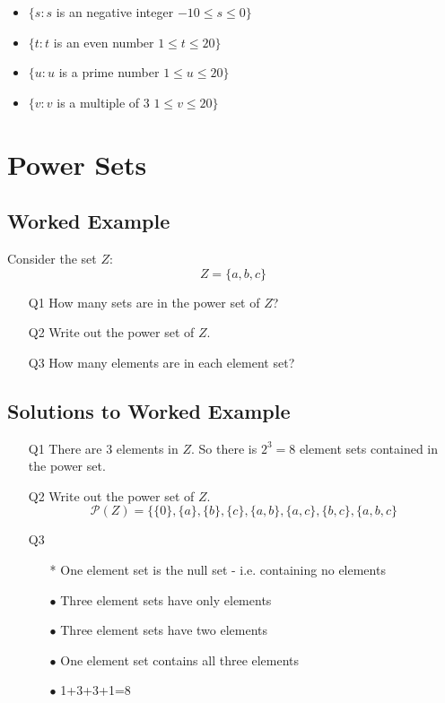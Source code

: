 \documentclass[MASTER.tex]{subfiles}
\begin{document}
\begin{itemize} 
\item $\{ s : s $ is an negative integer $ -10 \leq s \leq 0 \}$
\item $\{ t : t $ is an even number $ 1 \leq t \leq 20 \}$
\item $\{ u : u $ is a prime number $ 1 \leq u \leq 20 \}$
\item $\{ v : v $ is a multiple of 3 $ 1 \leq v \leq 20 \}$
\end{itemize}

\section*{Power Sets}
\subsection*{Worked Example}
Consider the set $Z$:
\[ Z = \{ a,b,c\}  \]
\begin{itemize}
\item[Q1] How many sets are in the power set of $Z$? 
\item[Q2] Write out the power set of $Z$. 
\item[Q3] How many elements are in each element set?
\end{itemize}
\subsection*{Solutions to Worked Example}

\begin{itemize}


\item[Q1] There are 3 elements in $Z$. So there is $2^3 = 8$ element sets contained in the power set.

\item[Q2] Write out the power set of $Z$.
\[ \mathcal{P}(Z) = \{ \{0\}, \{a\}, \{b\}, \{c\}, \{a,b\}, \{a,c\}, \{b,c\}, \{a,b,c\} \]

\item[Q3]
\begin{itemize}
\item[*] One element set is the null set - i.e. containing no
elements \item[$\bullet$] Three element sets have only elements \item[$\bullet$]
Three element sets have two elements \item[$\bullet$] One element set
contains all three elements \item[$\bullet$] 1+3+3+1=8
\end{itemize}
\end{itemize}
\end{document}
